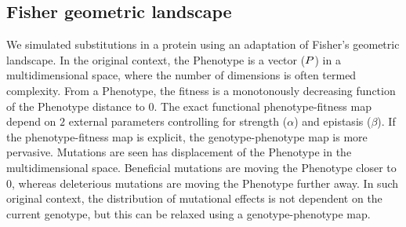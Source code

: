 \begin{table}[H]
    \centering
    \noindent{}
    \caption[Inferred amino-acid entropy for SimuPoly]{
    Estimated amino-acids entropy under simulation accounting for finite population effects, site linkage and short term fluctuation of $\Ne$.
    Obtained with the inference model of site selection for amino-acid, and branch fluctuation of $\Ne$ (left column), or under the assumption of constant $\Ne$ (right column)}
\end{table}

\subsection{Fisher geometric landscape}

We simulated \glspl{substitution} in a protein using an adaptation of Fisher's geometric landscape.
In the original context, the \gls{Phenotype} is a vector ($P$) in a multidimensional space, where the number of dimensions is often termed complexity.
From a \gls{Phenotype}, the fitness is a monotonously decreasing function of the \gls{Phenotype} distance to $0$.
The exact functional phenotype-fitness map depend on $2$ external parameters controlling for strength ($\alpha$) and epistasis ($\beta$).
If the phenotype-fitness map is explicit, the genotype-phenotype map is more pervasive.
Mutations are seen has displacement of the \gls{Phenotype} in the multidimensional space.
Beneficial mutations are moving the \gls{Phenotype} closer to $0$, whereas deleterious mutations are moving the \gls{Phenotype} further away.
In such original context, the distribution of mutational effects is not dependent on the current genotype, but this can be relaxed using a genotype-phenotype map.\\

